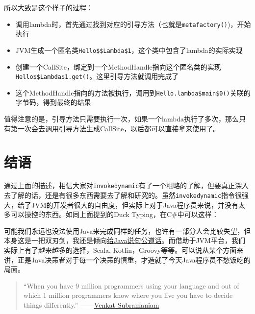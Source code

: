 \documentclass[12pt]{article}
\begin{document}
所以大致是这个样子的过程：

\begin{itemize}
\tightlist
\item
  调用lambda时，首先通过找到对应的引导方法（也就是\texttt{metafactory()})，开始执行
\item
  JVM生成一个匿名类\texttt{Hello\$\$Lambda\$1}，这个类中包含了lambda的实际实现
\item
  创建一个CallSite，绑定到一个MethodHandle指向这个匿名类的实现\texttt{Hello\$\$Lambda\$1.get()}。这里引导方法就调用完成了
\item
  这个MethodHandle指向的方法被执行，调用到\texttt{Hello.lambda\$main\$0()}关联的字节码，得到最终的结果
\end{itemize}

值得注意的是，引导方法只需要执行一次，如果一个lambda执行了多次，那么只有第一次会去调用引导方法生成CallSite，以后都可以直接拿来使用了。

\section{结语}\label{ux7ed3ux8bed}

通过上面的描述，相信大家对\texttt{invokedynamic}有了一个粗略的了解，但要真正深入去了解的话，还是有很多东西需要去了解和研究的。虽然\texttt{invokedynamic}指令很强大，给了JVM的开发者很大的自由度，但实际上对于Java程序员来说，并没有太多可以操控的东西。如同上面提到的Duck Typing，在C\#中可以这样：

\begin{Shaded}
\begin{Highlighting}[]
\OperatorTok{=}  
\OperatorTok{=}\OperatorTok{;}
\OperatorTok{();}     
\end{Highlighting}
\end{Shaded}

可能我们永远也没法使用Java来完成同样的任务，也许有一部分人会比较失望，但本身这是一把双刃剑，我还是倾向\href{http://www.yinwang.org/blog-cn/2016/01/18/java}{给Java说句公道话}。而借助于JVM平台，我们实际上有了越来越多的选择，Scala, Kotlin，Groovy等等。可以说从某个方面来讲，正是Java决策者对于每一个决策的慎重，才造就了今天Java程序员不愁饭吃的局面。

\begin{quote}
``When you have 9 million programmers using your language and out of which 1 million programmers know where you live you have to decide things differently.'' ------\href{https://www.youtube.com/watch?v=1OpAgZvYXLQ&t=1993s}{Venkat Subramaniam}
\end{quote}
\end{document}

